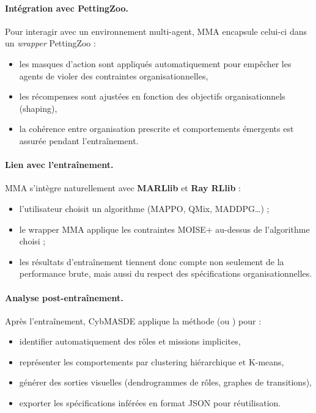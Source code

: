 \paragraph{Intégration avec PettingZoo.}
Pour interagir avec un environnement multi-agent, MMA encapsule celui-ci dans un \textit{wrapper} PettingZoo :
\begin{itemize}
  \item les masques d'action sont appliqués automatiquement pour empêcher les agents de violer des contraintes organisationnelles,
  \item les récompenses sont ajustées en fonction des objectifs organisationnels (shaping),
  \item la cohérence entre organisation prescrite et comportements émergents est assurée pendant l'entraînement.
\end{itemize}

\paragraph{Lien avec l'entraînement.}
MMA s'intègre naturellement avec \textbf{MARLlib} et \textbf{Ray RLlib} :
\begin{itemize}
  \item l'utilisateur choisit un algorithme (MAPPO, QMix, MADDPG…) ;
  \item le wrapper MMA applique les contraintes MOISE+ au-dessus de l'algorithme choisi ;
  \item les résultats d'entraînement tiennent donc compte non seulement de la performance brute, mais aussi du respect des spécifications organisationnelles.
\end{itemize}

\paragraph{Analyse post-entraînement.}
Après l'entraînement, CybMASDE applique la méthode  (ou ) pour :
\begin{itemize}
  \item identifier automatiquement des rôles et missions implicites,
  \item représenter les comportements par clustering hiérarchique et K-means,
  \item générer des sorties visuelles (dendrogrammes de rôles, graphes de transitions),
  \item exporter les spécifications inférées en format JSON pour réutilisation.
\end{itemize}

